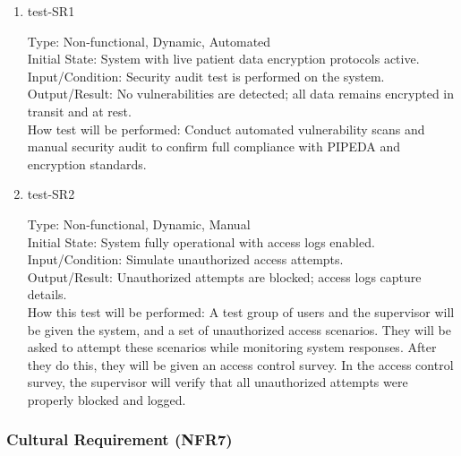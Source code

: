 \documentclass[12pt, titlepage]{article}
\begin{document}
\begin{enumerate}
    \item{test-SR1\\} \label{test-SR1}
    
    Type: Non-functional, Dynamic, Automated\\
    
    Initial State: System with live patient data encryption protocols active.\\
    
    Input/Condition: Security audit test is performed on the system.\\
    
    Output/Result: No vulnerabilities are detected; all data remains encrypted in transit and at rest.\\
    
    How test will be performed: Conduct automated vulnerability scans and manual security audit to confirm full compliance with PIPEDA and encryption standards.

    \item{test-SR2\\} \label{test-SR2}
    
    Type: Non-functional, Dynamic, Manual\\
    
    Initial State: System fully operational with access logs enabled.\\
    
    Input/Condition: Simulate unauthorized access attempts.\\
    
    Output/Result: Unauthorized attempts are blocked; access logs capture details.\\
    
    How this test will be performed: A test group of users and the supervisor will be given the system, and a set of unauthorized access scenarios. They will be asked to attempt these scenarios while monitoring system responses. After they do this, they will be given an access control survey. In the access control survey, the supervisor will verify that all unauthorized attempts were properly blocked and logged.
\end{enumerate}

\subsubsection{Cultural Requirement (NFR7)} \label{section:4.2.7}
\end{document}
